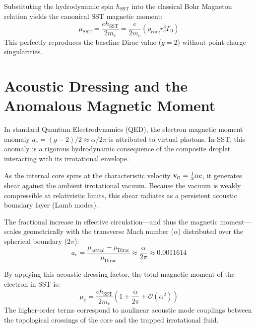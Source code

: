 \documentclass[11pt]{article}
\newcommand{\vswirl}{\mathbf{v}_{\mkern-2mu\scriptscriptstyle\boldsymbol{\circlearrowleft}}}
\newcommand{\rc}{r_c}                                    %
\newcommand{\rhocore}{\rho_{\text{core}}}
\newcommand{\GammaSST}{\Gamma_0}
\begin{document}
            Substituting the hydrodynamic spin $\hbar_{\text{SST}}$ into the classical Bohr Magneton relation yields the canonical SST magnetic moment:
            \begin{equation}
                \mu_{\text{SST}} = \frac{e \hbar_{\text{SST}}}{2 m_e} = \frac{e}{2 m_e} \left( \rhocore \rc^3 \GammaSST \right)
            \end{equation}
            This perfectly reproduces the baseline Dirac value ($g=2$) without point-charge singularities.

    \section{Acoustic Dressing and the Anomalous Magnetic Moment}
        \label{sec:g_factor}

        In standard Quantum Electrodynamics (QED), the electron magnetic moment anomaly $a_e = (g-2)/2 \approx \alpha/2\pi$ is attributed to virtual photons. In SST, this anomaly is a rigorous hydrodynamic consequence of the composite droplet interacting with its irrotational envelope.

        As the internal core spins at the characteristic velocity $\vswirl = \frac{1}{2}\alpha c$, it generates shear against the ambient irrotational vacuum. Because the vacuum is weakly compressible at relativistic limits, this shear radiates as a persistent acoustic boundary layer (Lamb modes).

        The fractional increase in effective circulation---and thus the magnetic moment---scales geometrically with the transverse Mach number ($\alpha$) distributed over the spherical boundary ($2\pi$):
        \begin{equation}
            a_e = \frac{\mu_{\text{actual}} - \mu_{\text{Dirac}}}{\mu_{\text{Dirac}}} \approx \frac{\alpha}{2\pi} \approx 0.0011614
        \end{equation}

        By applying this acoustic dressing factor, the total magnetic moment of the electron in SST is:
        \begin{equation}
            \mu_e = \frac{e \hbar_{\text{SST}}}{2 m_e} \left( 1 + \frac{\alpha}{2\pi} + \mathcal{O}(\alpha^2) \right)
        \end{equation}
        The higher-order terms correspond to nonlinear acoustic mode couplings between the topological crossings of the core and the trapped irrotational fluid.
\end{document}
